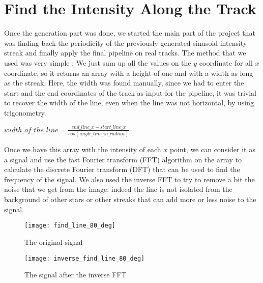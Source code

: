 \documentclass[a4paper,12pt,oneside]{report}
\begin{document}
\chapter{Find the Intensity Along the Track}
\label{findIntensityChapter}


Once the generation part was done, we started the main part of the project that was finding back the periodicity of the previously generated sinusoid 
intensity streak and finally apply the final pipeline on real tracks.
\newline
\newline
The method that we used was very simple : We just sum up all the values on the $y$ coordinate for all $x$ coordinate, so it returns an array 
with a height of one and with a width as long as the streak. Here, the width was found manually, since we had to enter the start and the end coordinates 
of the track as input for the pipeline, it was trivial to recover the width of the line, even when the line was not horizontal, by using trigonometry. 
\begin{center}
    $ \displaystyle width\_of\_the\_line = \frac{end\_line\_x - start\_line\_x}{cos(angle\_line\_in\_radian)}$
\end{center}
Once we have this array with the intensity of each $x$ point, we can consider it as a signal and use the fast Fourier transform (FFT) algorithm \cite{fastFourierTransform} 
on the array to calculate the discrete Fourier transform (DFT) that can be used to find the frequency of the signal. We also used the inverse FFT
to try to remove a bit the noise that we get from the image; indeed the line is not isolated from the background of other stars or other streaks 
that can add more or less noise to the signal. 
\newline
\begin{figure}[h]
    \begin{minipage}[c]{.47\linewidth}
        \centering
        \texttt{[image: find\_line\_80\_deg]}
        \caption{The original signal}
        \label{graphHorizontalLine}
    \end{minipage}
    \hfill
    \begin{minipage}[c]{.47\linewidth}
        \centering
        \texttt{[image: inverse\_find\_line\_80\_deg]}
        \caption{The signal after the inverse FFT}
    \end{minipage}
\end{figure}
\end{document}
